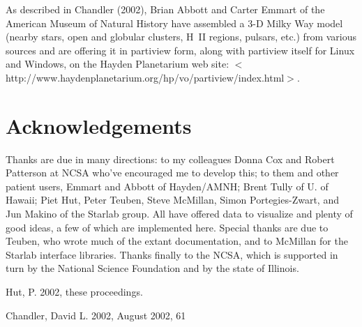 As described in Chandler (2002),
Brian Abbott and Carter Emmart of the American Museum of Natural
History have assembled a 3-D Milky Way model (nearby stars,
open and globular clusters, H~II regions, pulsars, etc.) from various
sources and are offering it in partiview form, along with partiview itself
for Linux and Windows, on the Hayden Planetarium web site:\hfill\break
$<$http://www.haydenplanetarium.org/hp/vo/partiview/index.html$>$.

\section{Acknowledgements}
Thanks are due in many directions: to my colleagues Donna Cox and
Robert Patterson at NCSA who've encouraged me to develop this;
to them and other patient users, Emmart and Abbott of Hayden/AMNH; Brent Tully
of U. of Hawaii; Piet Hut, Peter Teuben, Steve McMillan, Simon
Portegies-Zwart, and Jun Makino of the Starlab group.  All have offered data
to visualize and plenty of good ideas, a few of which are implemented here.
Special thanks are due to Teuben, who wrote much of the extant
documentation, and to McMillan for the Starlab interface libraries.
Thanks finally to the NCSA, which is supported in turn
by the National Science Foundation and by the state of Illinois.

\begin{thebibliography}
{Hut}, P. 2002, these proceedings.

{Chandler}, David L. 2002, \skytel August 2002, 61
\end{thebibliography}


